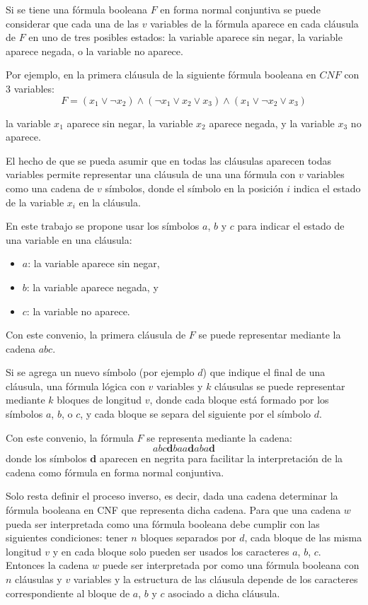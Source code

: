 Si se tiene una fórmula booleana $F$ en forma normal conjuntiva se puede considerar que cada una de las
$v$ variables de la fórmula aparece en cada cláusula de $F$ en uno de tres posibles estados: la variable
aparece sin negar, la variable aparece negada, o la variable no aparece.

Por ejemplo, en la primera cláusula de la siguiente fórmula booleana en $CNF$ con 3 variables:
$$F=(x_1 \vee \neg x_2) \wedge (\neg x_1 \vee x_2 \vee x_3) \wedge (x_1 \vee \neg x_2 \vee x_3)$$

la variable $x_1$ aparece sin negar, la variable $x_2$ aparece negada, y la variable $x_{3}$ no aparece.

El hecho de que se pueda asumir que en todas las cláusulas aparecen todas variables permite representar una cláusula de una una fórmula con $v$ variables como una cadena de $v$ símbolos, donde el símbolo en la posición $i$ indica el estado de la variable $x_i$ en la cláusula.

En este trabajo se propone usar los símbolos $a$, $b$ y $c$ para indicar el estado de una variable en una cláusula:

\begin{itemize}
    \item $a$: la variable aparece sin negar,
    \item $b$: la variable aparece negada, y
    \item $c$: la variable no aparece.
\end{itemize}

Con este convenio, la primera cláusula de $F$ se puede representar mediante la cadena $abc$.

Si se agrega un nuevo símbolo (por ejemplo $d$) que indique el final de una cláusula, una fórmula lógica con $v$ variables y $k$ cláusulas se puede representar mediante $k$ bloques de longitud $v$, donde cada bloque está formado por los símbolos $a$, $b$, o $c$, y cada bloque se separa del siguiente por el símbolo $d$.

Con este convenio, la fórmula $F$ se representa mediante la cadena:
$$abc\mathbf{d}baa\mathbf{d}aba\mathbf{d}$$
donde los símbolos $\mathbf{d}$ aparecen en negrita para facilitar la interpretación de la cadena como fórmula en forma normal conjuntiva.

Solo resta definir el proceso inverso, es decir, dada una cadena determinar la fórmula booleana en CNF que representa dicha cadena.
Para que una cadena $w$ pueda ser interpretada como una fórmula booleana debe cumplir con las siguientes condiciones:
tener $n$ bloques separados por $d$, cada bloque de las misma longitud $v$ y en cada bloque solo pueden ser usados los caracteres
$a$, $b$, $c$. Entonces la cadena $w$ puede ser interpretada por como una fórmula booleana con $n$ cláusulas y $v$ variables y la estructura
de las cláusula depende de los caracteres correspondiente al bloque de $a$, $b$ y $c$ asociado a dicha cláusula.

